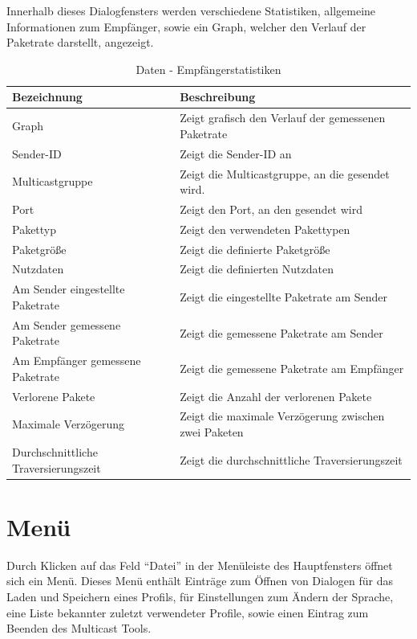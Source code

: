 Innerhalb dieses Dialogfensters werden verschiedene Statistiken, allgemeine
Informationen zum Empfänger, sowie ein Graph, welcher den Verlauf der Paketrate
darstellt, angezeigt.

\newpage
\begin{table}[h]
\caption{Daten - Empfängerstatistiken}
\label{tab:showEmpfaenger}
\begin{center}
\begin{tabular}{|p{6cm}|p{8cm}|}
\hline
\textbf{Bezeichnung} & \textbf{Beschreibung}\\
\hline
Graph & Zeigt grafisch den Verlauf der gemessenen Paketrate\\
\hline
Sender-ID & Zeigt die Sender-ID an\\
\hline
Multicastgruppe & Zeigt die Multicastgruppe, an die gesendet wird.\\
\hline
Port & Zeigt den Port, an den gesendet wird\\
\hline
Pakettyp & Zeigt den verwendeten Pakettypen\\
\hline
Paketgröße & Zeigt die definierte Paketgröße\\
\hline
Nutzdaten & Zeigt die definierten Nutzdaten\\
\hline
Am Sender eingestellte Paketrate & Zeigt die eingestellte Paketrate am Sender\\
\hline
Am Sender gemessene Paketrate & Zeigt die gemessene Paketrate am Sender\\
\hline
Am Empfänger gemessene Paketrate & Zeigt die gemessene Paketrate am Empfänger\\
\hline
Verlorene Pakete & Zeigt die Anzahl der verlorenen Pakete\\
\hline
Maximale Verzögerung & Zeigt die maximale Verzögerung zwischen zwei Paketen\\
\hline
Durchschnittliche Traversierungszeit & Zeigt die durchschnittliche
Traversierungszeit\\
\hline
\end{tabular}
\end{center}
\label{default}
\end{table}

\chapter{Menü}
Durch Klicken auf das Feld ``Datei'' in der Menüleiste des Hauptfensters öffnet
sich ein Menü. Dieses Menü enthält Einträge zum Öffnen von Dialogen für das
Laden und Speichern eines Profils, für Einstellungen zum Ändern der Sprache,
eine Liste bekannter zuletzt verwendeter Profile, sowie einen Eintrag zum
Beenden des Multicast Tools.

